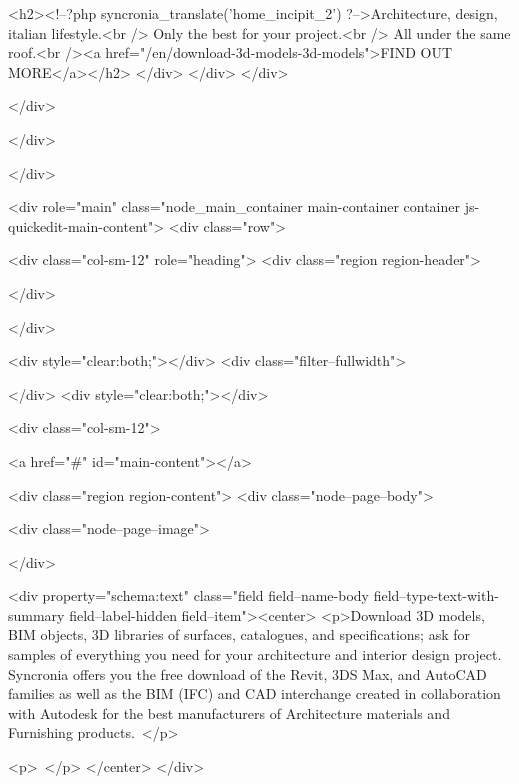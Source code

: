 <h2><!--?php syncronia_translate('home_incipit_2') ?-->Architecture, design, italian lifestyle.<br />
Only the best for your project.<br />
All under the same roof.<br /><a href="/en/download-3d-models-3d-models">FIND OUT MORE</a></h2>
</div>
</div>
</div>
      
  </div>


  </div>

    </div>
  


          <div role="main" class="node_main_container main-container container js-quickedit-main-content">
            <div class="row">

                                      <div class="col-sm-12" role="heading">
                <div class="region region-header">
    

  </div>

            </div>
                  
                <div style="clear:both;"></div>
        <div class="filter--fullwidth">
          
        </div>
        <div style="clear:both;"></div>

                
                        <div class="col-sm-12">

                    
                                              
                      

            

                                <a href="#" id="main-content"></a>
            
              <div class="region region-content">
      <div class="node--page--body">

<div class="node--page--image">
    
</div>


            <div property="schema:text" class="field field--name-body field--type-text-with-summary field--label-hidden field--item"><center>
<p>Download 3D models, BIM objects, 3D libraries of surfaces, catalogues, and specifications; ask for samples of everything you need for your architecture and interior design project. Syncronia offers you the free download of the Revit, 3DS Max, and AutoCAD families as well as the BIM (IFC) and CAD interchange created in collaboration with Autodesk for the best manufacturers of Architecture materials and Furnishing products. </p>

<p> </p>
</center>
</div>
      


